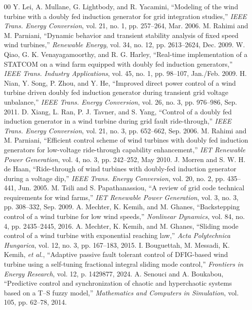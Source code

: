 \documentclass[conference]{IEEEtran}
\begin{document}
\begin{thebibliography}{00}
 Y. Lei, A. Mullane, G. Lightbody, and R. Yacamini, ``Modeling of the wind turbine with a doubly fed induction generator for grid integration studies,'' \textit{IEEE Trans. Energy Conversion}, vol. 21, no. 1, pp. 257--264, Mar. 2006.
 M. Rahimi and M. Parniani, ``Dynamic behavior and transient stability analysis of fixed speed wind turbines,'' \textit{Renewable Energy}, vol. 34, no. 12, pp. 2613--2624, Dec. 2009.
 W. Qiao, G. K. Venayagamoorthy, and R. G. Harley, ``Real-time implementation of a STATCOM on a wind farm equipped with doubly fed induction generators,'' \textit{IEEE Trans. Industry Applications}, vol. 45, no. 1, pp. 98--107, Jan./Feb. 2009.
 H. Nian, Y. Song, P. Zhou, and Y. He, ``Improved direct power control of a wind turbine driven doubly fed induction generator during transient grid voltage unbalance,'' \textit{IEEE Trans. Energy Conversion}, vol. 26, no. 3, pp. 976--986, Sep. 2011.
 D. Xiang, L. Ran, P. J. Tavner, and S. Yang, ``Control of a doubly fed induction generator in a wind turbine during grid fault ride-through,'' \textit{IEEE Trans. Energy Conversion}, vol. 21, no. 3, pp. 652--662, Sep. 2006.
 M. Rahimi and M. Parniani, ``Efficient control scheme of wind turbines with doubly fed induction generators for low-voltage ride-through capability enhancement,'' \textit{IET Renewable Power Generation}, vol. 4, no. 3, pp. 242--252, May 2010.
 J. Morren and S. W. H. de Haan, ``Ride-through of wind turbines with doubly-fed induction generator during a voltage dip,'' \textit{IEEE Trans. Energy Conversion}, vol. 20, no. 2, pp. 435--441, Jun. 2005.
 M. Tsili and S. Papathanassiou, ``A review of grid code technical requirements for wind farms,'' \textit{IET Renewable Power Generation}, vol. 3, no. 3, pp. 308--332, Sep. 2009.
 A. Mechter, K. Kemih, and M. Ghanes, ``Backstepping control of a wind turbine for low wind speeds,'' \textit{Nonlinear Dynamics}, vol. 84, no. 4, pp. 2435--2445, 2016.
 A. Mechter, K. Kemih, and M. Ghanes, ``Sliding mode control of a wind turbine with exponential reaching law,'' \textit{Acta Polytechnica Hungarica}, vol. 12, no. 3, pp. 167--183, 2015.
 I. Bouguettah, M. Messadi, K. Kemih, \textit{et al.}, ``Adaptive passive fault tolerant control of DFIG-based wind turbine using a self-tuning fractional integral sliding mode control,'' \textit{Frontiers in Energy Research}, vol. 12, p. 1429877, 2024.
 A. Senouci and A. Boukabou, ``Predictive control and synchronization of chaotic and hyperchaotic systems based on a T--S fuzzy model,'' \textit{Mathematics and Computers in Simulation}, vol. 105, pp. 62--78, 2014.

\end{thebibliography}
\end{document}
